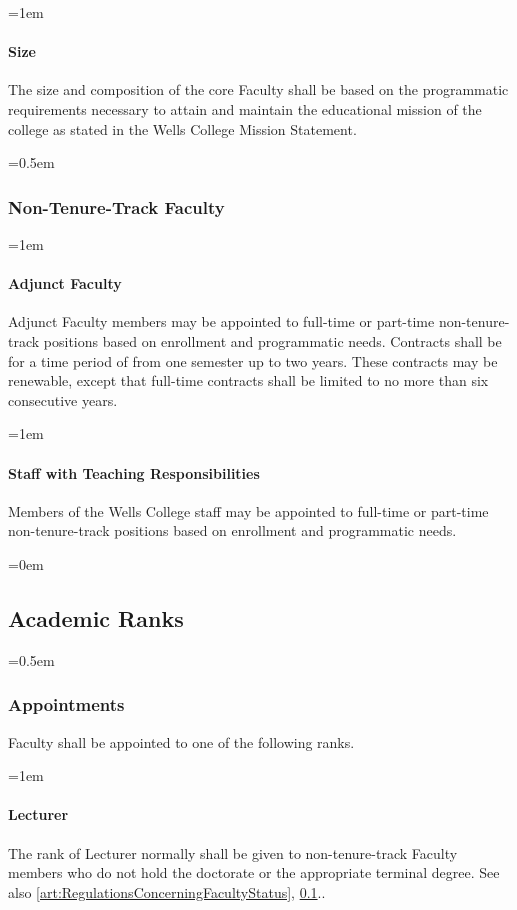 \documentclass{manual}
\let\oldsubsection\subsection
\renewcommand\subsection{\leftskip=0em\oldsubsection}
\let\oldsubsubsection\subsubsection
\renewcommand\subsubsection{\leftskip=0.5em\oldsubsubsection}
\let\oldparagraph\paragraph
\renewcommand\paragraph{\leftskip=1em\oldparagraph}
\begin{document}
\paragraph{Size} 
The size and composition of the core Faculty shall be based on the programmatic requirements necessary to attain and maintain the educational mission of the college as stated in the Wells College Mission Statement.

\subsubsection{Non-Tenure-Track Faculty}

\paragraph{Adjunct Faculty}

Adjunct Faculty members may be appointed to full-time or part-time non-tenure-track positions based on enrollment and programmatic needs. Contracts shall be for a time period of from one semester up to two years. These contracts may be renewable, except that full-time contracts shall be limited to no more than six consecutive years. 

\paragraph{Staff with Teaching Responsibilities}

Members of the Wells College staff may be appointed to full-time or part-time non-tenure-track positions based on enrollment and programmatic needs.

\subsection{Academic Ranks}\label{sec:AcademicRanks}

\subsubsection{Appointments}
Faculty shall be appointed to one of the following ranks.

\paragraph{Lecturer}
The rank of Lecturer normally shall be given to non-tenure-track Faculty members who do not hold the doctorate or the appropriate terminal degree. See also \cref{art:RegulationsConcerningFacultyStatus}, \cref{sec:AcademicRanks}..
\end{document}
